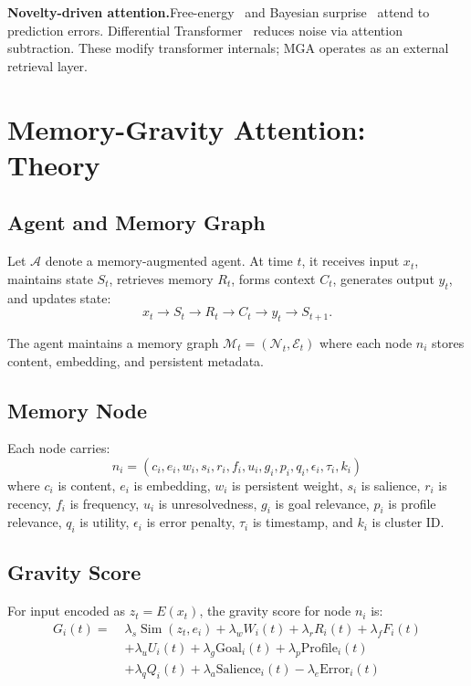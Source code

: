 \documentclass{article}
\newcommand{\agent}{\mathcal{A}}
\newcommand{\memory}{\mathcal{M}}
\newcommand{\nodes}{\mathcal{N}}
\newcommand{\simfn}{\operatorname{Sim}}
\begin{document}
\textbf{Novelty-driven attention.}\quad Free-energy~\citep{friston2010free} and Bayesian surprise~\citep{itti2009bayesian} attend to prediction errors. Differential Transformer~\citep{ye2024diff} reduces noise via attention subtraction. These modify transformer internals; MGA operates as an external retrieval layer.

\section{Memory-Gravity Attention: Theory}

\subsection{Agent and Memory Graph}

Let $\agent$ denote a memory-augmented agent. At time $t$, it receives input $x_t$, maintains state $S_t$, retrieves memory $R_t$, forms context $C_t$, generates output $y_t$, and updates state:
\[
x_t \rightarrow S_t \rightarrow R_t \rightarrow C_t \rightarrow y_t \rightarrow S_{t+1}.
\]

The agent maintains a memory graph $\memory_t = (\nodes_t, \mathcal{E}_t)$ where each node $n_i$ stores content, embedding, and persistent metadata.

\subsection{Memory Node}

Each node carries:
\[
n_i = (c_i, e_i, w_i, s_i, r_i, f_i, u_i, g_i, p_i, q_i, \epsilon_i, \tau_i, k_i)
\]
where $c_i$ is content, $e_i$ is embedding, $w_i$ is persistent weight, $s_i$ is salience, $r_i$ is recency, $f_i$ is frequency, $u_i$ is unresolvedness, $g_i$ is goal relevance, $p_i$ is profile relevance, $q_i$ is utility, $\epsilon_i$ is error penalty, $\tau_i$ is timestamp, and $k_i$ is cluster ID.

\subsection{Gravity Score}

For input encoded as $z_t = E(x_t)$, the gravity score for node $n_i$ is:
\begin{align}
G_i(t) =\;& \lambda_s \simfn(z_t, e_i) + \lambda_w W_i(t) + \lambda_r R_i(t) + \lambda_f F_i(t) \nonumber\\
&+ \lambda_u U_i(t) + \lambda_g \text{Goal}_i(t) + \lambda_p \text{Profile}_i(t) \nonumber\\
&+ \lambda_q Q_i(t) + \lambda_a \text{Salience}_i(t) - \lambda_e \text{Error}_i(t)
\label{eq:gravity}
\end{align}
\end{document}
